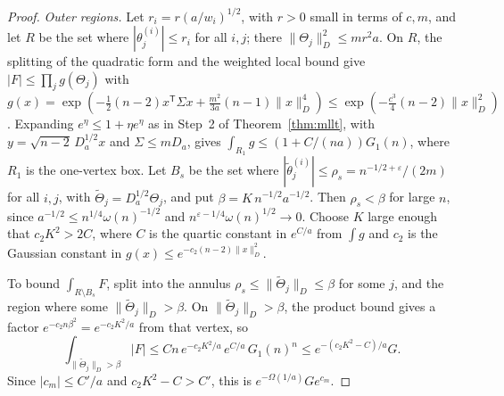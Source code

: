 \documentclass[11pt]{article}
\begin{document}
\begin{proof}
\emph{Outer regions.}
Let \(r_i=r(a/w_i)^{1/2}\), with \(r>0\) small in terms of \(c,m\), and let \(R\) be the
set where \(|\theta^{(i)}_j|\le r_i\) for all \(i,j\); there
\(\|\Theta_j\|_D^2\le mr^2a\).
On \(R\), the splitting of the quadratic form and the weighted local bound give
\(|F|\le\prod_jg(\Theta_j)\) with
\(g(x)=\exp(-\frac12(n-2)x^{\mathsf T}\Sigma x+\frac{m^2}{3a}(n-1)\|x\|_D^4)
\le\exp(-\frac{c^3}4(n-2)\|x\|_D^2)\).
Expanding \(e^\eta\le1+\eta e^\eta\) as in Step~2 of Theorem~\ref{thm:mllt}, with
\(y=\sqrt{n-2}\,D_a^{1/2}x\) and \(\Sigma\le mD_a\), gives
\(\int_{R_1}g\le(1+C/(na))G_1(n)\), where \(R_1\) is the one-vertex box.
Let \(B_s\) be the set where \(|\tilde\theta^{(i)}_j|\le\rho_s=n^{-1/2+\varepsilon}/(2m)\) for all
\(i,j\), with \(\tilde\Theta_j=D_a^{1/2}\Theta_j\), and put
\(\beta=K\,n^{-1/2}a^{-1/2}\). Then \(\rho_s<\beta\) for large \(n\), since
\(a^{-1/2}\le n^{1/4}\omega(n)^{-1/2}\) and \(n^{\varepsilon-1/4}\omega(n)^{1/2}\to0\).
Choose \(K\) large enough that \(c_2K^2>2C\), where \(C\) is the quartic
constant in \(e^{C/a}\) from \(\int g\) and \(c_2\) is the Gaussian constant in
\(g(x)\le e^{-c_2(n-2)\|x\|_D^2}\).

To bound \(\int_{R\setminus B_s}F\), split into the annulus
\(\rho_s\le\|\tilde\Theta_j\|_D\le\beta\) for some \(j\), and the region where some
\(\|\tilde\Theta_j\|_D>\beta\).
On \(\|\tilde\Theta_j\|_D>\beta\), the product bound gives a factor
\(e^{-c_2n\beta^2}=e^{-c_2K^2/a}\) from that vertex, so
\[
\int_{\|\tilde\Theta_j\|_D>\beta}|F|
\le Cn\,e^{-c_2K^2/a}\,e^{C/a}\,G_1(n)^n
\le e^{-(c_2K^2-C)/a}G.
\]
Since \(|c_m|\le C'/a\) and \(c_2K^2-C>C'\), this is
\(e^{-\Omega(1/a)}Ge^{c_m}\).


\end{proof}
\end{document}
